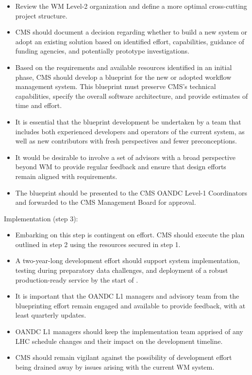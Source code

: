  \begin{itemize}
    \item Review the \gls{WM} Level-2 organization and define a more optimal cross-cutting project structure.
    
    \item CMS should document a decision regarding whether to build a new system or adopt an existing solution based on identified effort, capabilities, guidance of funding agencies, and potentially prototype investigations.
    
    \item Based on the requirements and available resources identified in an initial phase, CMS should develop a blueprint for the new or adopted workflow management system. This blueprint must preserve CMS’s technical capabilities, specify the overall software architecture, and provide estimates of time and effort.
    
    \item It is essential that the blueprint development be undertaken by a team that includes both experienced developers and operators of the current system, as well as new contributors with fresh perspectives and fewer preconceptions.
    
    \item It would be desirable to involve a set of advisors with a broad perspective beyond \gls{WM} to provide regular feedback and ensure that design efforts remain aligned with requirements. 
    
    \item The blueprint should be presented to the CMS \gls{OANDC} Level-1 Coordinators and forwarded to the CMS Management Board for approval. 
\end{itemize} 

Implementation (step 3):

\begin{itemize}
    \item Embarking on this step is contingent on effort. CMS should execute the plan outlined in step 2 using the resources secured in step 1.
    
    \item A two-year-long development effort should support system implementation, testing during preparatory data challenges, and deployment of a robust production-ready service by the start of \RunFour.
    
    \item It is important that the \gls{OANDC} L1 managers and advisory team from the blueprinting effort remain engaged and available to provide feedback, with at least quarterly updates. 
    
    \item \gls{OANDC} L1 managers should keep the implementation team apprised of any LHC schedule changes and their impact on the development timeline.
    
    \item CMS should remain vigilant against the possibility of development effort being drained away by issues arising with the current WM system. 
\end{itemize}   

